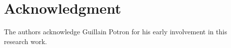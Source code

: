 \documentclass{llncs}
\begin{document}

\section{Acknowledgment}

The authors acknowledge Guillain Potron for his early involvement in this research work.



\nocite{rsync}
\nocite{wagner}



\appendix
\end{document}
